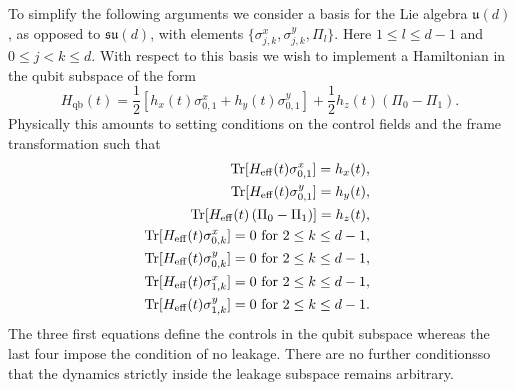 \documentclass[pra,twocolumn,floatfix,superscriptaddress,eqsecnum]{revtex4-1}
\begin{document}
To simplify the following arguments we consider a basis for the Lie algebra $\mathfrak{u}(d)$, as opposed to $\mathfrak{su}(d)$, with elements $\{\sigma_{j,k}^x, \sigma_{j,k}^y, \Pi_l \}$.  Here $1\leq l\leq d-1$ and $0\leq j<k\leq d$.
With respect to this basis we wish to implement a Hamiltonian in the qubit subspace of the form
\begin{equation}
H_\mathrm{qb}(t)= {\frac{1}{2}}\left[h_x(t)\sigma^x_{0,1}+
h_y(t)\sigma^y_{0,1}\right] + \frac{1}{2}h_z(t) \left(\Pi_0 - \Pi_1\right) .
\label{eq:Hwantq}\end{equation} 
Physically this amounts to setting
conditions  on the control fields and the frame transformation such that
\begin{eqnarray}\label{eq:conds}
&&\hspace{-5mm}\mathrm{Tr}[ H_\mathrm{eff}(t) \sigma^x_{0,1}]=h_x(t),  \\
&&\hspace{-5mm}\mathrm{Tr}[ H_\mathrm{eff}(t) \sigma^y_{0,1}]= h_y(t),  \\
&&\hspace{-5mm}\mathrm{Tr}[ H_\mathrm{eff}(t)  \left(\Pi_0 - \Pi_1 \right)]= h_z(t), \label{eq:conds2}\\
&&\hspace{-5mm}\mathrm{Tr}[ H_\mathrm{eff}(t) \sigma^x_{0,k}]=0~  \mathrm{for}~2 \leq k \leq d-1,\label{eq:conds2a}\\
&&\hspace{-5mm}\mathrm{Tr}[ H_\mathrm{eff}(t) \sigma^y_{0,k}]=0~  \mathrm{for}~2 \leq k \leq d-1,\\
&&\hspace{-5mm}\mathrm{Tr}[ H_\mathrm{eff}(t) \sigma^x_{1,k}]=0~  \mathrm{for}  ~2 \leq k \leq d-1,\\
&&\hspace{-5mm}\mathrm{Tr}[ H_\mathrm{eff}(t) \sigma^y_{1,k}]=0~  \mathrm{for}~  2 \leq k \leq d-1.\label{eq:conds3}
\end{eqnarray}
The three first equations define the controls in the qubit subspace whereas the last four impose the condition of no leakage. There are no further conditionsso that the dynamics strictly inside the leakage subspace remains arbitrary.
\end{document}
